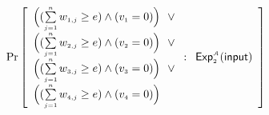 \begin{definition}
{\small{
$$ \Pr\left[
  \begin{array}{l}
  
 
\Big( (\sum\limits_{\st j=1}^{\st n}w_{\st 1,j}\geq e) \wedge ( v_{\st 1}=0)\Big) 
 
\ \ \vee\\ \Big(( \sum\limits_{\st j=1}^{\st n}w_{\st 2,j}\geq e) \wedge ( v_{\st 2}=0)\Big) 
\ \ \vee \\ \Big(( \sum\limits_{\st j=1}^{\st n}w_{\st 3,j}\geq e) \wedge ( v_{\st 3}=0)\Big) 
\ \ \vee \\  \Big(( \sum\limits_{\st j=1}^{\st n}w_{\st 4,j}\geq e) \wedge ( v_{\st 4}=0)\Big) \\
\end{array} :
    \begin{array}{l}
    \mathsf{Exp}_{\st 2}^{\st\mathcal{A}}(\mathsf{input})\\
\end{array}    \right]$$
}}

\end{definition}




